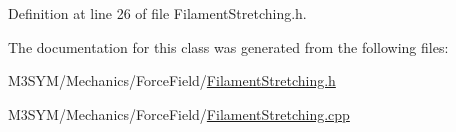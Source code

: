 Definition at line 26 of file Filament\+Stretching.\+h.



The documentation for this class was generated from the following files\+:\begin{DoxyCompactItemize}
\item 
M3\+S\+Y\+M/\+Mechanics/\+Force\+Field/\hyperlink{FilamentStretching_8h}{Filament\+Stretching.\+h}\item 
M3\+S\+Y\+M/\+Mechanics/\+Force\+Field/\hyperlink{FilamentStretching_8cpp}{Filament\+Stretching.\+cpp}\end{DoxyCompactItemize}
